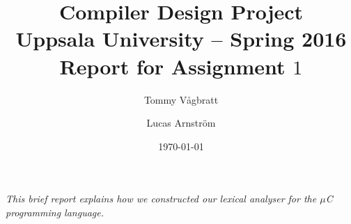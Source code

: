 \documentclass[a4paper,11pt]{article}
\title{\textbf{Compiler Design Project\\
    Uppsala University -- Spring 2016 \\
    Report for Assignment $1$}}
\author{Tommy V\aa gbratt \and Lucas Arnstr\"om}
\date{\today}
\begin{document}
\maketitle


\noindent
\textit{This brief report explains how we constructed our lexical analyser
for the $\mu$C programming language.}


\end{document}
